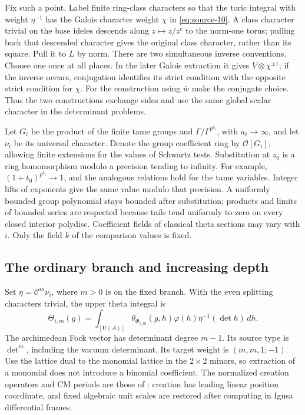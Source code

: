 Fix such a point.  Label finite ring-class characters so that the
toric integral with weight $\eta^{-1}$ has the Galois character
weight $\chi$ in \eqref{eq:source-10}.  A class character trivial on
the base ideles descends along $z\mapsto z/z^c$ to the norm-one
torus; pulling back that descended character gives the original
class character, rather than its square.  Pull it to $L$ by norm.
There are two simultaneous inverse conventions.  Choose one once
at all places.  In the later Galois extraction it gives
$V\otimes\chi^{\pm1}$; if the inverse occurs, conjugation identifies
its strict condition with the opposite strict condition for $\chi$.
For the construction using $\bar w$ make the conjugate choice.  Thus
the two constructions exchange sides and use the same global scalar
character in the determinant problems.

Let $G_i$ be the product of the finite tame groups and
$\Gamma/\Gamma^{p^{a_i}}$, with $a_i\to\infty$, and let $\nu_i$ be
its universal character.  Denote the group coefficient ring by
$\mathcal O[G_i]$, allowing finite extensions for the values of
Schwartz tests.  Substitution at $z_0$ is a ring homomorphism modulo
a precision tending to infinity.  For example,
$(1+t_0)^{p^{a_i}}\to1$, and the analogous relations hold for the
tame variables.  Integer lifts of exponents give the same value
modulo that precision.  A uniformly bounded group polynomial stays
bounded after substitution; products and limits of bounded series
are respected because tails tend uniformly to zero on every closed
interior polydisc.  Coefficient fields of classical theta sections
may vary with $i$.  Only the field $k$ of the comparison values is
fixed.

\subsection{The ordinary branch and increasing depth}

Set $\eta=\mathcal C^m\nu_i$, where $m>0$ is on the fixed branch.
With the even splitting characters trivial, the upper theta integral is
\[
 \Theta_{i,m}(g)
 =\int_{[\mathrm U(A)]}\theta_{\Phi_{i,m}}(g,h)
       \varphi(h)\eta^{-1}(\det h)\,dh.
\]
The archimedean Fock vector has determinant degree $m-1$.  Its
source type is $\det^m$, including the vacuum determinant.  Its
target weight is $(m,m,1;-1)$.  Use the lattice dual to the monomial
lattice in the $2\times2$ minors, so extraction of a monomial does
not introduce a binomial coefficient.  The normalized creation
operators and CM periods are those of
\cite[Section 4, ``Frames, periods, and unary moments'']{C}: creation
has leading linear position coordinate, and fixed algebraic unit
scales are restored after computing in Igusa differential frames.

